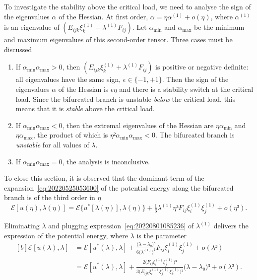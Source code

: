 \documentclass[12pt, final]{scrartcl}
\theoremstyle{definition}
\newcommand{\E}{\mathcal E}
\newcommand{\order}[2][1]{#2^{(#1)}}
\begin{document}
\begin{center}
\end{center}

To investigate the stability above the critical load, we need to analyse the
sign of the eigenvalues $α$ of the Hessian. At first order,
$α = η \order[1]α + o(η)$, where $\order[1]α$ is an eigenvalue of
$(E_{ijk} \order[1]{ξ_k} + \order[1]\lambda F_{ij})$. Let $α_{\min}$ and $α_{\max}$ be the minimum
and maximum eigenvalues of this second-order tensor. Three cases must be
discussed
\begin{enumerate}
\item If $α_{\min} α_{\max} > 0$, then $(E_{ijk} \order[1]{ξ_k} + \order[1]\lambda F_{ij})$ is
  positive or negative definite: all eigenvalues have the same sign,
  $\epsilon ∈ \{-1, +1\}$. Then the sign of the eigenvalues $α$ of the
  Hessian is $\epsilon η$ and there is a stability switch at the critical
  load. Since the bifurcated branch is unstable \emph{below} the critical load,
  this means that it is \emph{stable} above the critical load.
\item If $α_{\min} α_{\max} < 0$, then the extremal eigenvalues of the Hessian
  are $η α_{\min}$ and $η α_{\max}$, the product of which is
  $η² α_{\min} α_{\max} < 0$. The bifurcated branch is \emph{unstable} for all
  values of $\lambda$.
\item If $α_{\min} α_{\max} = 0$, the analysis is inconclusive.
\end{enumerate}

To close this section, it is observed that the dominant term of the
expansion~\eqref{eq:20220525053600} of the potential energy along the bifurcated
branch is of the third order in $η$
\begin{equation}
  \E[u(η), \lambda(η)] = \E\{u^{\ast}[\lambda(η)], \lambda(η)\} + \tfrac{1}{6} \order[1]\lambda η³ F_{i j} \order[1]{ξ_i} \order[1]{ξ_j} + o(η³).
\end{equation}

Eliminating $\lambda$ and plugging expression~\eqref{eq:20220801085236} of $\order[1]\lambda$
delivers the expression of the potential energy, where $\lambda$ is the parameter
\begin{equation}
  \begin{aligned}[b]
    \E[u(\lambda), \lambda] &= \E[u^{\ast}(\lambda), \lambda] + \frac{\bigl(\lambda - \lambda₀\bigr)³}{6\bigl( \order[1]\lambda \bigr)^2} F_{i j} \order[1]{ξ_i} \order[1]{ξ_j} + o(\lambda³)\\
    &= \E[u^{\ast}(\lambda), \lambda] + \frac{2 \bigl( F_{i j} \order[1]{ξ_i} \order[1]{ξ_j} \bigr)³}{3 \bigl( E_{ijk} \order[1]{ξ_i} \order[1]{ξ_j} \order[1]{ξ_k} \bigr)²} \bigl(\lambda - \lambda₀\bigr)³ + o(\lambda³).
  \end{aligned}
\end{equation}
\end{document}
